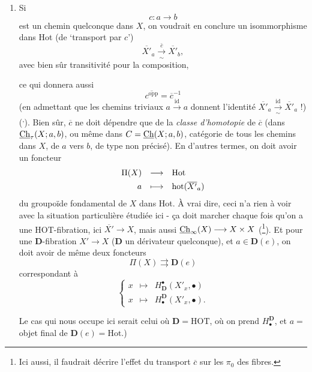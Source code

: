 \begin{enumerate}[label={}, leftmargin=*]
\item[4$^o$)] Si
\[
c:a\longrightarrow b
\]
est un chemin quelconque dans $X$, on voudrait en conclure un isommorphisme dans Hot (de `transport par $c$') %
\[
\overline{X'}_a\xrightarrow[\sim]{\bar{c}}\overline{X'}_b,
\]
avec bien sûr transitivité pour la composition,


ce qui donnera aussi
\[
\overline{c^{\mathrm{opp}}}=\overline{c}^{-1}
\]
(en admettant que les chemins triviaux $a\xrightarrow{\mathrm{id}}a$ donnent l'identité $\overline{X'}_a\xrightarrow[\sim]{\mathrm{id}}\overline{X'}_a$ !) (\footnotemark[32]\textsuperscript{,}\footnotemark[33]). Bien sûr, $\overline{c}$ ne doit dépendre que de la \textit{classe d'homotopie} de $\overline{c}$ (dans %
$\underline{\mathrm{Ch}}_\tau(X;a,b)$, ou même dans $C=\underline{\mathrm{Ch}}(X;a,b)$, catégorie de tous les chemins dans $X$, de $a$ vers $b$, de type non précisé). En d'autres termes, on doit avoir un foncteur
\[
\begin{array}{rcl}
\Pi(X) & \longrightarrow & \mathrm{Hot}\\[4pt]
a & \longmapsto & \mathrm{hot}(\overline{X'}_a)
\end{array}
\]
du groupoïde fondamental de $X$ dans Hot. À vrai dire, ceci n'a rien à voir avec la situation particulière étudiée ici - ça doit marcher chaque fois qu'on a une HOT-fibration, ici $\overline{X'}\longrightarrow X$, mais aussi $\underline{\mathrm{Ch}}_\infty(X)\longrightarrow X\times X$ (\footnote[34]{Ici aussi, il faudrait décrire l'effet du transport $\overline{c}$ sur les $\pi_0$ des fibres.}). Et pour une $\mathbf{D}$-fibration $X'\longrightarrow X$ ($\mathbf{D}$ un dérivateur quelconque), et $a\in\mathbf{D}(e)$, on doit avoir de même deux foncteurs
\[
\Pi(X)\rightrightarrows\mathbf{D}(e)
\]
correspondant à
\[
\left\{\begin{array}{lcl}
x & \longmapsto & H^\bullet_{\mathbf{D}}(X'_x,\bullet)\\[4pt]
x & \longmapsto & H_\bullet^{\mathbf{D}}(X'_x,\bullet).
\end{array}\right.
\]


Le cas qui nous occupe ici serait celui où $\mathbf{D}=\mathrm{HOT}$, où on prend $H^{\mathbf{D}}_\bullet$, et $a=$ objet final de $\mathbf{D}(e)=\mathrm{Hot}$.)


\end{enumerate}
